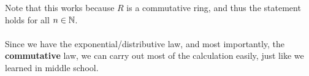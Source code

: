 Note that this works because $R$ is a commutative ring, and thus the statement holds for all $n\in \mathbb{N}$.\\
\\
 Since we have the exponential/distributive law, and most importantly, the \textbf{commutative} law, we can carry out most of the calculation easily, just like we learned in middle school.

\pagebreak